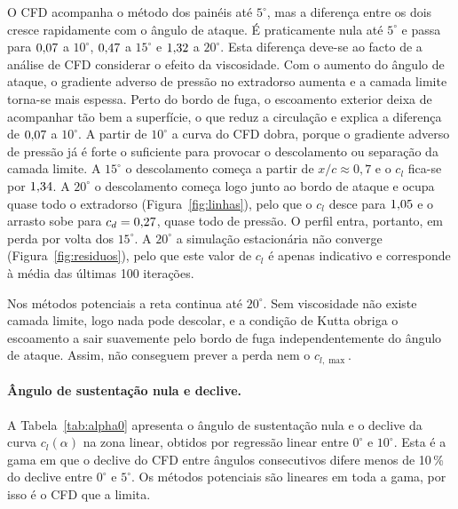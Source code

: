 O CFD acompanha o método dos painéis até $5^\circ$, mas a diferença entre
os dois cresce rapidamente com o ângulo de ataque. É praticamente nula até
$5^\circ$ e passa para $\Resultado{\DifClPaineisCFDDez}$ a $10^\circ$, $\Resultado{\DifClPaineisCFDQuinze}$ a $15^\circ$ e $\Resultado{\DifClPaineisCFDVinte}$ a
$20^\circ$. Esta diferença deve-se ao facto de a análise de CFD considerar o
efeito da viscosidade. Com o aumento do ângulo de ataque, o gradiente adverso
de pressão no extradorso aumenta e a camada limite torna-se mais espessa. Perto
do bordo de fuga, o escoamento exterior deixa de acompanhar tão bem a superfície,
o que reduz a circulação e explica a diferença de $\Resultado{\DifClPaineisCFDDez}$ a $10^\circ$. A partir
de $10^\circ$ a curva do CFD dobra, porque o gradiente adverso de pressão já é
forte o suficiente para provocar o descolamento ou separação da camada limite. A
$15^\circ$ o descolamento começa a partir de $x/c \approx 0{,}7$ e o
$c_l$ fica-se por $\Resultado{\ClCFDQuinze}$. A $20^\circ$ o descolamento começa logo junto ao
bordo de ataque e ocupa quase todo o extradorso (Figura~\ref{fig:linhas}), pelo
que o $c_l$ desce para $\Resultado{\ClCFDVinte}$ e o arrasto sobe para $c_d = \Resultado{\CdCFDVinte}$, quase todo
de pressão. O perfil entra, portanto, em perda por volta dos $15^\circ$.
A $20^\circ$ a simulação estacionária não converge
(Figura~\ref{fig:residuos}), pelo que este valor de $c_l$ é apenas indicativo e corresponde à média das
últimas 100 iterações.

Nos métodos potenciais a reta continua até $20^\circ$. Sem viscosidade não
existe camada limite, logo nada pode descolar, e a condição de Kutta obriga o escoamento a sair
suavemente pelo bordo de fuga independentemente do ângulo de ataque. Assim, não
conseguem prever a perda nem o $c_{l,\max}$.

\paragraph{Ângulo de sustentação nula e declive.}
A Tabela~\ref{tab:alpha0} apresenta o ângulo de sustentação nula e o declive da
curva $c_l(\alpha)$ na zona linear, obtidos por regressão linear entre
$0^\circ$ e $10^\circ$. Esta é a gama em que o declive do CFD entre ângulos
consecutivos difere menos de 10\,\% do declive entre $0^\circ$ e $5^\circ$. Os
métodos potenciais são lineares em toda a gama, por isso é o CFD que a limita.

